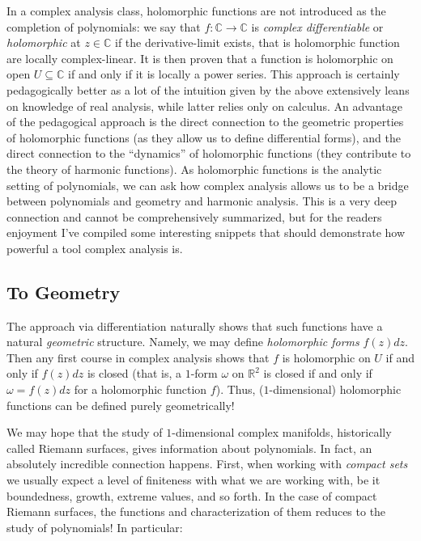 \documentclass[oneside]{article}
\newcommand{\C}{\mathbb{C}}
\newcommand{\R}{\mathbb{R}}
\newcommand{\sse}{\subseteq}
\begin{document}
In a complex analysis class, holomorphic functions are not introduced as the completion of polynomials: we say
that $f: \C \to \C$ is \emph{complex differentiable} or \emph{holomorphic} at $z \in \C$ if the
derivative-limit exists, that is holomorphic function are locally complex-linear. It is then
proven that a function is holomorphic on open $U \sse \C$ if and only if it is locally a power series. This
approach is certainly pedagogically better as a lot of the intuition given by the above extensively leans on
knowledge of real analysis, while latter relies only on calculus. An advantage of the pedagogical approach is the direct
connection to the geometric properties of holomorphic functions (as they allow us to define differential forms),
and the direct connection to the ``dynamics'' of holomorphic functions (they contribute to the theory of
harmonic functions). As holomorphic functions is the analytic setting of polynomials, we can ask how complex
analysis allows us to be a bridge between polynomials and geometry and harmonic analysis. This is a very deep
connection and cannot be comprehensively summarized, but for the readers enjoyment I've compiled some
interesting snippets that should demonstrate how powerful a tool complex analysis is.


\subsection{To Geometry}



The approach via differentiation naturally shows that such functions have a
natural \emph{geometric} structure. Namely, we may define \emph{holomorphic forms} $f(z)dz$. Then any first
course in complex analysis shows that $f$ is holomorphic on $U$ if and only if $f(z)dz$ is closed (that is, a
$1$-form $\omega$ on $\R^2$ is closed if and only if $\omega = f(z)dz$ for a holomorphic function $f$). Thus,
($1$-dimensional) holomorphic functions can be defined purely geometrically!

We may hope that the study of $1$-dimensional complex manifolds, historically called Riemann surfaces, gives information
about polynomials. In fact, an absolutely incredible connection happens. First, when working with
\emph{compact sets} we usually expect a level of finiteness with what we are working with, be it boundedness,
growth, extreme values, and so forth. In the case of compact Riemann surfaces, the functions and
characterization of them reduces to the study of polynomials! In particular:
\end{document}
